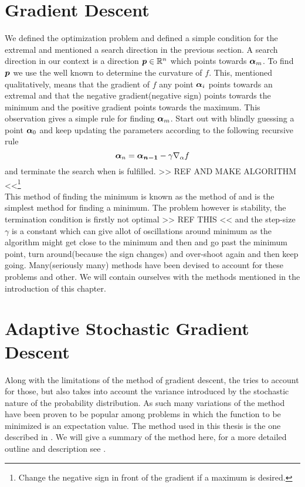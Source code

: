 \section{Gradient Descent\label{sec:gradient_descent}}
    We defined the optimization problem and defined a simple condition for the
    extremal and mentioned a search direction in the previous section. A search
    direction in our context is a direction $\boldsymbol{{p}}\in\mathbb{R}^n$ which
    points towards $\boldsymbol{{\alpha}}_m$. To find $\boldsymbol{{p}}$ we use the well known
     to determine the curvature of $f$. This,
    mentioned qualitatively, means that the gradient of $f$ any point
    $\boldsymbol{{\alpha}}_i$ points towards an extremal and that the negative
    gradient(negative sign) points towards the minimum and the positive
    gradient points towards the maximum. This observation gives a simple rule
    for finding $\boldsymbol{{\alpha}}_m$. Start out with blindly guessing a point
    $\boldsymbol{{\alpha}}_0$ and keep updating the parameters according to the
    following recursive rule
        \begin{equation}
            \boldsymbol{{\alpha}}_n = \boldsymbol{{\alpha_{n-1}}} - \gamma\nabla_{\alpha} f
            \label{eq:gdupdate}
        \end{equation}
    and terminate the search when  is fulfilled. >>
    REF AND MAKE ALGORITHM <<\footnote{Change the negative sign in front of the
    gradient if a maximum is desired.} \\

    This method of finding the minimum is known as the method of
     and is the simplest method for finding a minimum.
    The problem however is stability, the termination condition is firstly not
    optimal >> REF THIS << and the step-size $\gamma$ is a constant which can
    give allot of oscillations around minimum as the algorithm might get close
    to the minimum and then  and go past the minimum point,
    turn around(because the sign changes) and over-shoot again and then keep
    going. Many(seriously many) methods have been devised to account for these
    problems and other. We will contain ourselves with the methods mentioned in
    the introduction of this chapter.

\section{Adaptive Stochastic Gradient
Descent\label{sec:adaptive_stochastic_gradient_descent}}
    Along with the limitations of the method of gradient descent, the
     tries to account for those,
    but also takes into account the variance introduced by the stochastic
    nature of the probability distribution. As such many variations of the
    method have been proven to be popular among problems in which the function
    to be minimized is an expectation value. The method used in this thesis is
    the one described in \cite{ASGD}. We will give a summary of the method
    here, for a more detailed outline and description see \cite{ASGD}. \\

